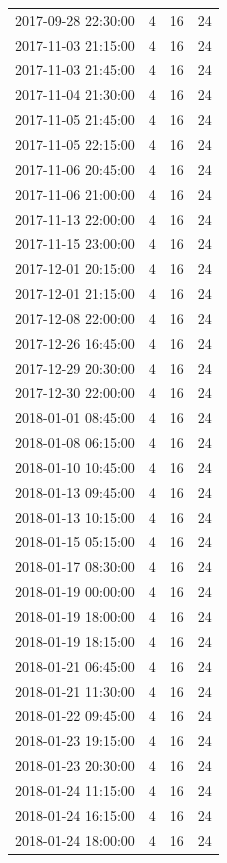 \begin{tabular}{lrrr}
2017-09-28 22:30:00 & 4 & 16 & 24 \\
2017-11-03 21:15:00 & 4 & 16 & 24 \\
2017-11-03 21:45:00 & 4 & 16 & 24 \\
2017-11-04 21:30:00 & 4 & 16 & 24 \\
2017-11-05 21:45:00 & 4 & 16 & 24 \\
2017-11-05 22:15:00 & 4 & 16 & 24 \\
2017-11-06 20:45:00 & 4 & 16 & 24 \\
2017-11-06 21:00:00 & 4 & 16 & 24 \\
2017-11-13 22:00:00 & 4 & 16 & 24 \\
2017-11-15 23:00:00 & 4 & 16 & 24 \\
2017-12-01 20:15:00 & 4 & 16 & 24 \\
2017-12-01 21:15:00 & 4 & 16 & 24 \\
2017-12-08 22:00:00 & 4 & 16 & 24 \\
2017-12-26 16:45:00 & 4 & 16 & 24 \\
2017-12-29 20:30:00 & 4 & 16 & 24 \\
2017-12-30 22:00:00 & 4 & 16 & 24 \\
2018-01-01 08:45:00 & 4 & 16 & 24 \\
2018-01-08 06:15:00 & 4 & 16 & 24 \\
2018-01-10 10:45:00 & 4 & 16 & 24 \\
2018-01-13 09:45:00 & 4 & 16 & 24 \\
2018-01-13 10:15:00 & 4 & 16 & 24 \\
2018-01-15 05:15:00 & 4 & 16 & 24 \\
2018-01-17 08:30:00 & 4 & 16 & 24 \\
2018-01-19 00:00:00 & 4 & 16 & 24 \\
2018-01-19 18:00:00 & 4 & 16 & 24 \\
2018-01-19 18:15:00 & 4 & 16 & 24 \\
2018-01-21 06:45:00 & 4 & 16 & 24 \\
2018-01-21 11:30:00 & 4 & 16 & 24 \\
2018-01-22 09:45:00 & 4 & 16 & 24 \\
2018-01-23 19:15:00 & 4 & 16 & 24 \\
2018-01-23 20:30:00 & 4 & 16 & 24 \\
2018-01-24 11:15:00 & 4 & 16 & 24 \\
2018-01-24 16:15:00 & 4 & 16 & 24 \\
2018-01-24 18:00:00 & 4 & 16 & 24 \\

\end{tabular}
